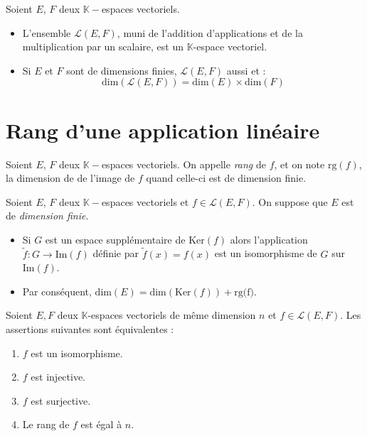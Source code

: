 \documentclass[a4paper,10pt]{report}
\begin{document}
\begin{prop} Soient $E$, $F$ deux $\mathbb{K}-$espaces vectoriels.

\begin{itemize}
\item L'ensemble $\mathcal{L}(E,F)$, muni de l'addition d'applications et de la multiplication par un scalaire, est un $\mathbb{K}$-espace vectoriel.
\item Si $E$ et $F$ sont de dimensions finies, $\mathcal{L}(E,F)$ aussi et :
$$ \textrm{dim}( \mathcal{L}(E,F)) = \textrm{dim}(E) \times \textrm{dim}(F)$$
\end{itemize}
\end{prop}

\section{Rang d'une application linéaire}

\begin{defin} Soient $E$, $F$ deux $\mathbb{K}-$espaces vectoriels. On appelle \textit{rang} de $f$, et on note $\textrm{rg}(f)$, la dimension de de l'image de $f$ quand celle-ci est de dimension finie.
\end{defin}

\begin{thm} Soient $E$, $F$ deux $\mathbb{K}-$espaces vectoriels et $f \in \mathcal{L}(E,F)$. On suppose que $E$ est de \textit{dimension finie}.

\begin{itemize}
\item Si $G$ est un espace supplémentaire de $\textrm{Ker}(f)$ alors l'application $\tilde{f} : G \rightarrow\textrm{Im}(f)$ définie par \newline $\tilde{f}(x)=f(x)$ est un isomorphisme de $G$ sur $\textrm{Im}(f)$.
\item Par conséquent, $\textrm{dim}(E) = \textrm{dim}(\textrm{Ker}(f)) + \textrm{rg(f)}$.
\end{itemize}
\end{thm}

\begin{thm} Soient $E, F$ deux $\mathbb{K}$-espaces vectoriels de même dimension $n$ et $f \in \mathcal{L}(E,F)$. Les assertions suivantes sont équivalentes :

\begin{enumerate}
\item $f$ est un isomorphisme.
\item $f$ est injective.
\item $f$ est surjective.
\item Le rang de $f$ est égal à $n$.
\end{enumerate}
\end{thm}
\end{document}
